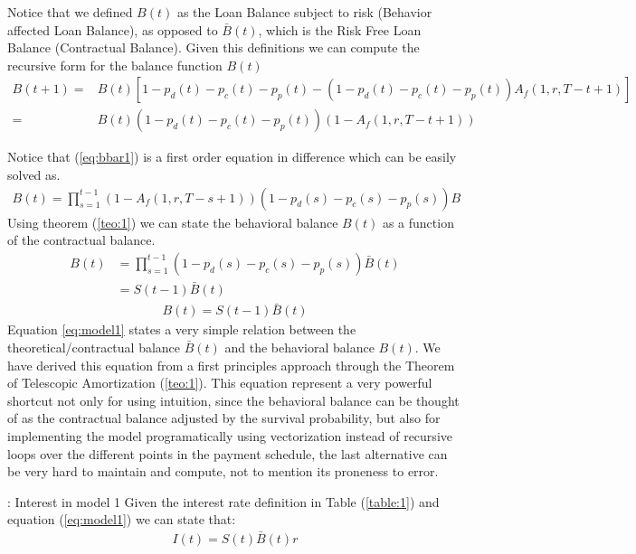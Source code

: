 Notice that we defined $B(t)$ as the Loan Balance subject to risk (Behavior affected Loan Balance), as opposed to $\bar{B}(t)$, which is the Risk Free Loan Balance (Contractual Balance).  Given this definitions we can compute the recursive form for the balance function $B(t)$
\begin{align}
B(t+1) =& B(t)[1-p_d(t)-p_c(t)-p_p(t)-(1-p_d(t)-p_c(t)-p_p(t))A_f(1,r,T-t+1) ] \nonumber\\
     =&
    B(t)(1-p_d(t)-p_c(t)-p_p(t))(1-A_f(1,r,T-t+1)) \label{eq:bbar1}\
\end{align}


Notice that (\ref{eq:bbar1}) is a first order equation in difference which can be easily solved as.
\begin{align}
    B(t) =\prod^{t-1}_{s=1} (1-A_f(1,r,T-s+1))(1-p_d(s)-p_c(s)-p_p(s))B
\end{align}
Using theorem (\ref{teo:1}) we can state the behavioral balance $B(t)$ as a function of the contractual balance.
\begin{align}
    B(t) &=\prod^{t-1}_{s=1} (1-p_d(s)-p_c(s)-p_p(s))\bar{B}(t) \nonumber\\
    &=S(t-1)\bar{B}(t) \nonumber
\end{align}
\begin{align}
    \boxed{B(t)=S(t-1)\bar{B}(t) } \label{eq:model1}
\end{align}
Equation \ref{eq:model1} states a very simple relation between the theoretical/contractual balance $\bar{B}(t)$ and the behavioral balance $B(t)$. We have derived this equation from a first principles approach through the Theorem of Telescopic Amortization (\ref{teo:1}). This equation represent a very powerful shortcut not only for using intuition, since the behavioral balance can be thought of as the contractual balance adjusted by the survival probability, but also for implementing the model programatically using vectorization instead of recursive loops over the different points in the payment schedule, the last alternative can be very hard to maintain and compute, not to mention its proneness to error.
\begin{corollary}{: Interest in model 1}
Given the interest rate definition in Table (\ref{table:1}) and equation (\ref{eq:model1}) we can state that:
\begin{align}
    \boxed{I(t)=S(t)\bar{B}(t)r}
\end{align}


\end{corollary}

